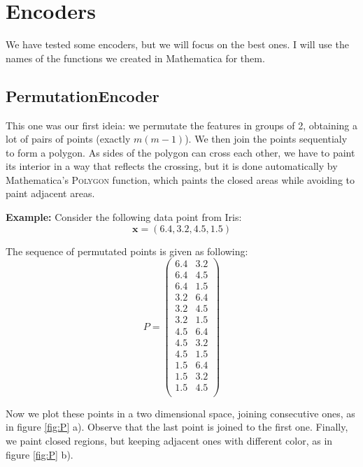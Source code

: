 \documentclass[11pt]{article}
\begin{document}
\section{Encoders} \label{sec:encoders}

We have tested some encoders, but we will focus on the best ones. I will use the names of the functions we created in Mathematica for them.

\subsection{PermutationEncoder}
This one was our first ideia: we permutate the features in groups of 2, obtaining a lot of pairs of points (exactly $m(m-1)$). We then join the points sequentialy to form a polygon. As sides of the polygon can cross each other, we have to paint its interior in a way that reflects the crossing, but it is done automatically by Mathematica's \textsc{Polygon} function, which paints the closed areas while avoiding to paint adjacent areas.

\textbf{Example:} Consider the following data point from Iris:
\[
\mathbf{x} = (6.4,3.2,4.5,1.5)
\]

The sequence of permutated points is given as following:
\[
P = 
\left(
\begin{array}{cc}
 6.4 & 3.2 \\
 6.4 & 4.5 \\
 6.4 & 1.5 \\
 3.2 & 6.4 \\
 3.2 & 4.5 \\
 3.2 & 1.5 \\
 4.5 & 6.4 \\
 4.5 & 3.2 \\
 4.5 & 1.5 \\
 1.5 & 6.4 \\
 1.5 & 3.2 \\
 1.5 & 4.5 \\
\end{array}
\right)
\]

Now we plot these points in a two dimensional space, joining consecutive ones, as in figure \ref{fig:P} a). Observe that the last point is joined to the first one. Finally, we paint closed regions, but keeping adjacent ones with different color, as in figure \ref{fig:P} b).
\end{document}
